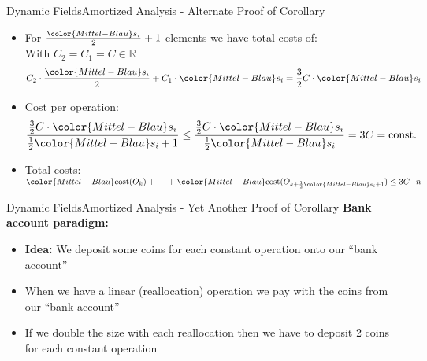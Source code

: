 \begin{frame}{Dynamic Fields}{Amortized Analysis - Alternate Proof of Corollary}
  \begin{itemize}
    \item
      For $\frac{\color{Mittel-Blau}s_i}{2} + 1$ elements we have total
      {\color{Mittel-Blau}costs} of:\\
      \hspace{1.5em}With $C_2 = C_1 = C \in \mathbb{R}$
      \begin{displaymath}
        C_2 \cdot \frac{\color{Mittel-Blau}s_i}{2}
        + C_1 \cdot {\color{Mittel-Blau}s_i}
        = \frac{3}{2} C \cdot {\color{Mittel-Blau}s_i}
      \end{displaymath}
    \item
      Cost per operation:
      \begin{displaymath}
        \frac{
          \frac{3}{2} C \cdot {\color{Mittel-Blau}s_i}
        }{
          \frac{1}{2}{\color{Mittel-Blau}s_i} + 1
        }
        \leq
        \frac{
          \frac{3}{2} C \cdot {\color{Mittel-Blau}s_i}
        }{
          \frac{1}{2}{\color{Mittel-Blau}s_i}
        }
        = 3 C = \text{const.}
      \end{displaymath}
    \item
    Total costs:
    \begin{math}
      {\color{Mittel-Blau}\mathrm{cost}(O_k)}+\dots+
      {\color{Mittel-Blau}
        \mathrm{cost}(O_{k+\frac{1}{2}{\color{Mittel-Blau}s_i} + 1})}
      \leq 3C \cdot n
    \end{math}
  \end{itemize}
\end{frame}


\begin{frame}{Dynamic Fields}{Amortized Analysis -
    Yet Another Proof of Corollary}
  \textbf{Bank account paradigm:}
  \begin{itemize}
    \item
      \textbf{Idea:}
      We deposit some coins for each constant operation onto our
      \enquote{bank account}
    \item
      When we have a linear (reallocation) operation we pay with the coins
      from our \enquote{bank account}
    \item
      If we double the size with each reallocation then we have to deposit
      2 coins for each constant operation
  \end{itemize}
\end{frame}

